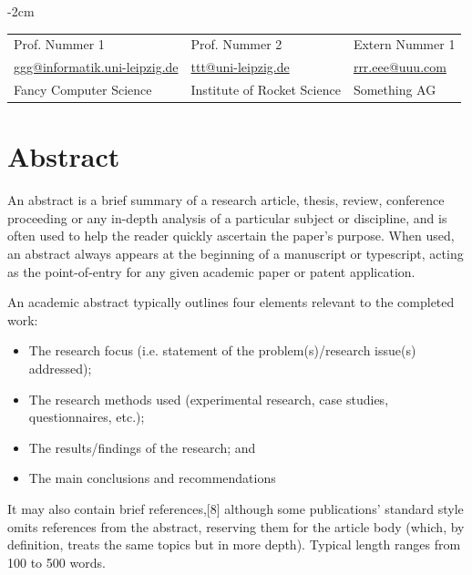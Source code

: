 \documentclass[11pt, a4paper, twoside, openright, final]{book}
\makeatletter
\numberwithin{equation}{chapter}		%
\renewcommand*{\cleardoublepage}{\clearpage\if@twoside \ifodd\c@page\else
\hbox{}%
\thispagestyle{empty}%
\newpage%
\if@twocolumn\hbox{}\newpage\fi\fi\fi}
\newcommand{\1}{\mathbbm{1}}
\makeatother
\begin{document}
\begin{titlepage}
\begin{adjustwidth*}{}{-2cm}
\begin{tabular}{*{3}{C{4cm}}}
			\small Prof. Nummer 1 & 
			\small Prof. Nummer 2 & 
			\small Extern Nummer 1 \\
			
			\small \href{mailto:ggg@informatik.uni-leipzig.de}{ggg@informatik.uni-leipzig.de} & 
			\small \href{mailto:ttt@uni-leipzig.de}{ttt@uni-leipzig.de} &
			\small \href{mailto:rrr.eee@uuu.com}{rrr.eee@uuu.com} \\
			
			\small Fancy Computer Science & 
			\small Institute of Rocket Science & 
			\small Something AG\\
		\end{tabular}
		
		\vspace{1.0cm}
		\centering{\today}
	\end{adjustwidth*}
\end{titlepage}
\cleardoublepage





\setcounter{page}{1}	%

\chapter*{Abstract}
\label{c:abstract}
An abstract is a brief summary of a research article, thesis, review, conference proceeding or any in-depth analysis of a particular subject or discipline, and is often used to help the reader quickly ascertain the paper's purpose. When used, an abstract always appears at the beginning of a manuscript or typescript, acting as the point-of-entry for any given academic paper or patent application.

An academic abstract typically outlines four elements relevant to the completed work:
\begin{itemize}
   \item The research focus (i.e. statement of the problem(s)/research issue(s) addressed);
   \item The research methods used (experimental research, case studies, questionnaires, etc.);
   \item The results/findings of the research; and
   \item The main conclusions and recommendations
\end{itemize}

It may also contain brief references,[8] although some publications' standard style omits references from the abstract, reserving them for the article body (which, by definition, treats the same topics but in more depth). Typical length ranges from 100 to 500 words.
\end{document}
